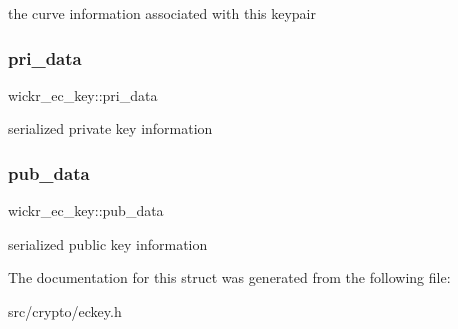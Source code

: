 the curve information associated with this keypair \mbox{\label{structwickr__ec__key_a67c23110b722401c6ba8b883b3aa74fc}} 
\subsubsection{\texorpdfstring{pri\+\_\+data}{pri\_data}}
{\footnotesize\ttfamily wickr\+\_\+ec\+\_\+key\+::pri\+\_\+data}

serialized private key information \mbox{\label{structwickr__ec__key_af972d3c8b571df0ef009ebf079705e82}} 
\subsubsection{\texorpdfstring{pub\+\_\+data}{pub\_data}}
{\footnotesize\ttfamily wickr\+\_\+ec\+\_\+key\+::pub\+\_\+data}

serialized public key information 

The documentation for this struct was generated from the following file\+:\begin{DoxyCompactItemize}
\item 
src/crypto/eckey.\+h\end{DoxyCompactItemize}

